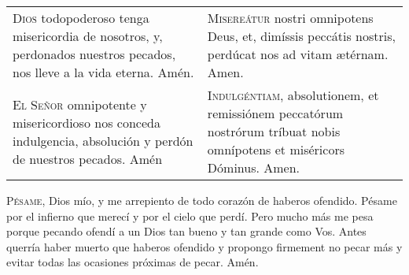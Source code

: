 \documentclass[./00_main.tex]{subfiles}
\begin{document}
\begin{longtable} { p{} p{} }
    \textsc{Dios} todopoderoso tenga misericordia de nosotros, y, perdonados nuestros pecados, nos lleve a la vida eterna. Amén.
        &
    \textsc{Misereátur} nostri omnipotens Deus, et, dimíssis peccátis nostris, perdúcat nos ad vitam {\ae}térnam. Amen.\\

    \textsc{El Señor} omnipotente y misericordioso nos conceda indulgencia, absolución y perdón de nuestros pecados. Amén
        &
    \textsc{Indulgéntiam}, absolutionem, et remissiónem peccatórum nostrórum tríbuat nobis omnípotens et miséricors Dóminus. Amen.
\end{longtable}

\label{condolences}
\textsc{Pésame}, Dios mío, y me arrepiento de todo corazón de haberos ofendido. Pésame por el infierno que merecí y por el cielo que perdí. Pero mucho
más me pesa porque pecando ofendí a un Dios tan bueno y tan grande como Vos. Antes querría haber muerto que haberos ofendido y propongo firmement no pecar
más y evitar todas las ocasiones próximas de pecar. Amén.
\end{document}
